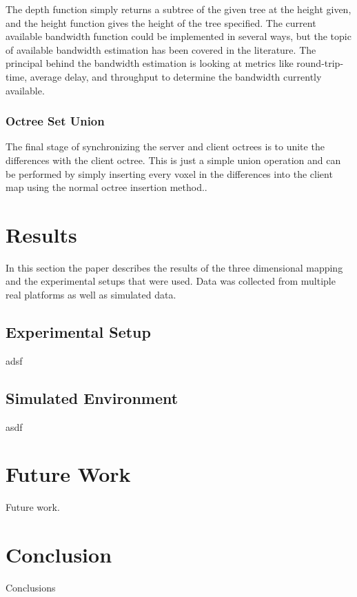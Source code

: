 \documentclass[journal]{IEEEtran}
\begin{document}
  The depth function simply returns a subtree of the given tree at the height given, and the height function gives the height of the tree specified.  The current available bandwidth function could be implemented in several ways, but the topic of available bandwidth estimation has been covered in the literature.\cite{prasad2003bandwidth}  The principal behind the bandwidth estimation is looking at metrics like round-trip-time, average delay, and throughput to determine the bandwidth currently available.
  
  \subsubsection{Octree Set Union}
  The final stage of synchronizing the server and client octrees is to unite
  the differences with the client octree. This is just a simple union
  operation and can be performed by simply inserting every voxel in the
  differences into the client map using the normal octree insertion
  method.\cite{meagher1982geometric}.
  
  \section{Results}
  In this section the paper describes the results of the three dimensional mapping and the experimental setups that were used.  Data was collected from multiple real platforms as well as simulated data.
  
  \subsection{Experimental Setup}
  \label{sec:experimental_setup}
  adsf
  
  \subsection{Simulated Environment}
  asdf
  
  \section{Future Work}
  Future work.
  
  \section{Conclusion}
  Conclusions
  
  \newpage
  
\end{document}
